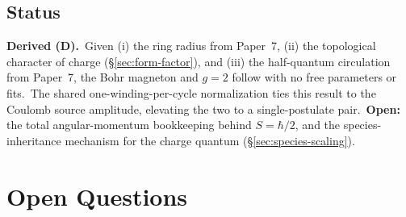 \documentclass[12pt,letterpaper]{article}
\begin{document}
\subsection{Status}

\textbf{Derived (D).}\ Given (i) the ring radius from Paper~7, (ii) the
topological character of charge (§\ref{sec:form-factor}), and (iii) the
half-quantum circulation from Paper~7, the Bohr magneton and $g = 2$
follow with no free parameters or fits.\ The shared
one-winding-per-cycle normalization ties this result to the Coulomb
source amplitude, elevating the two to a single-postulate pair.\
\textbf{Open:} the total angular-momentum bookkeeping behind
$S = \hbar/2$, and the species-inheritance mechanism for the charge
quantum (§\ref{sec:species-scaling}).


\section{Open Questions}
\label{sec:open-questions}
\end{document}
